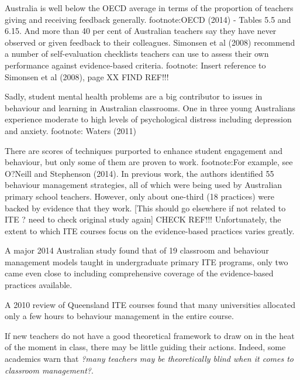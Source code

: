 Australia is well below the OECD average in terms of the proportion of teachers giving and receiving feedback generally. footnote:OECD (2014)  - Tables 5.5 and 6.15.
And more than 40 per cent of Australian teachers say they have never observed or given feedback to their colleagues. %
Simonsen et al (2008) recommend a number of self-evaluation checklists teachers can use to assess their own performance against evidence-based criteria. footnote: Insert reference to Simonsen et al (2008), page XX FIND REF!!!

Sadly, student mental health problems are a big contributor to issues in behaviour and learning in Australian classrooms. One in three young Australians experience moderate to high levels of psychological distress including depression and anxiety. footnote: Waters (2011)

There are scores of techniques purported to enhance student engagement and behaviour, but only some of them are proven to work. footnote:For example, see O?Neill and Stephenson (2014). In previous work, the authors identified 55 behaviour management strategies, all of which were being used by Australian primary school teachers. However, only about one-third (18 practices) were backed by evidence that they work. [This should go elsewhere if not related to ITE ? need to check original study again] CHECK REF!!!
Unfortunately, the extent to which ITE courses focus on the evidence-based practices varies greatly.  %

A major 2014 Australian study found that of 19 classroom and behaviour management models taught in undergraduate primary ITE programs, only two came even close to including comprehensive coverage of the evidence-based practices available. %

A 2010 review of Queensland ITE courses found that many universities allocated only a few hours to behaviour management in the entire course.  %

If new teachers do not have a good theoretical framework to draw on in the heat of the moment in class, there may be little guiding their actions. Indeed, some academics warn that \emph{?many teachers may be theoretically blind when it comes to classroom management?}.  %

